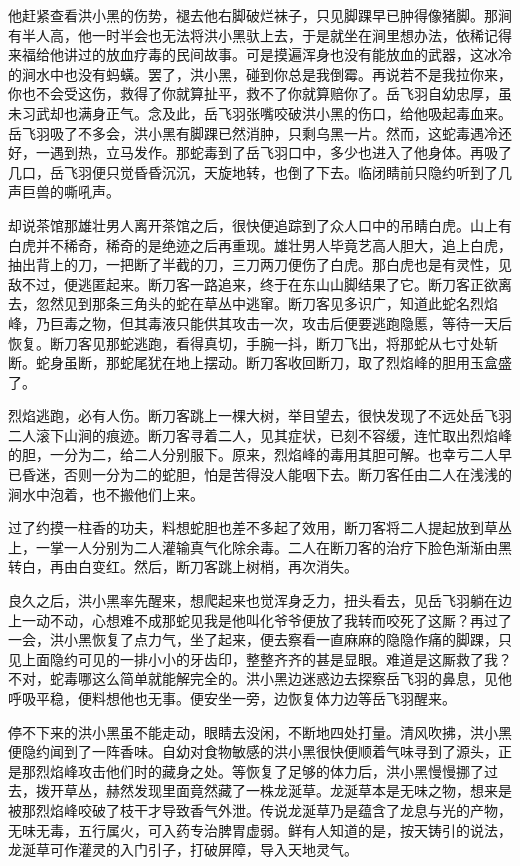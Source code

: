 他赶紧查看洪小黑的伤势，褪去他右脚破烂袜子，只见脚踝早已肿得像猪脚。那涧有半人高，他一时半会也无法将洪小黑驮上去，于是就坐在涧里想办法，依稀记得来福给他讲过的放血疗毒的民间故事。可是摸遍浑身也没有能放血的武器，这冰冷的涧水中也没有蚂蟥。罢了，洪小黑，碰到你总是我倒霉。再说若不是我拉你来，你也不会受这伤，救得了你就算扯平，救不了你就算赔你了。岳飞羽自幼忠厚，虽未习武却也满身正气。念及此，岳飞羽张嘴咬破洪小黑的伤口，给他吸起毒血来。岳飞羽吸了不多会，洪小黑有脚踝已然消肿，只剩乌黑一片。然而，这蛇毒遇冷还好，一遇到热，立马发作。那蛇毒到了岳飞羽口中，多少也进入了他身体。再吸了几口，岳飞羽便只觉昏昏沉沉，天旋地转，也倒了下去。临闭睛前只隐约听到了几声巨兽的嘶吼声。

却说茶馆那雄壮男人离开茶馆之后，很快便追踪到了众人口中的吊睛白虎。山上有白虎并不稀奇，稀奇的是绝迹之后再重现。雄壮男人毕竟艺高人胆大，追上白虎，抽出背上的刀，一把断了半截的刀，三刀两刀便伤了白虎。那白虎也是有灵性，见敌不过，便逃匿起来。断刀客一路追来，终于在东山山脚结果了它。断刀客正欲离去，忽然见到那条三角头的蛇在草丛中逃窜。断刀客见多识广，知道此蛇名烈焰峰，乃巨毒之物，但其毒液只能供其攻击一次，攻击后便要逃跑隐慝，等待一天后恢复。断刀客见那蛇逃跑，看得真切，手腕一抖，断刀飞出，将那蛇从七寸处斩断。蛇身虽断，那蛇尾犹在地上摆动。断刀客收回断刀，取了烈焰峰的胆用玉盒盛了。

烈焰逃跑，必有人伤。断刀客跳上一棵大树，举目望去，很快发现了不远处岳飞羽二人滚下山涧的痕迹。断刀客寻着二人，见其症状，已刻不容缓，连忙取出烈焰峰的胆，一分为二，给二人分别服下。原来，烈焰峰的毒用其胆可解。也幸亏二人早已昏迷，否则一分为二的蛇胆，怕是苦得没人能咽下去。断刀客任由二人在浅浅的涧水中泡着，也不搬他们上来。

过了约摸一柱香的功夫，料想蛇胆也差不多起了效用，断刀客将二人提起放到草丛上，一掌一人分别为二人灌输真气化除余毒。二人在断刀客的治疗下脸色渐渐由黑转白，再由白变红。然后，断刀客跳上树梢，再次消失。

良久之后，洪小黑率先醒来，想爬起来也觉浑身乏力，扭头看去，见岳飞羽躺在边上一动不动，心想难不成那蛇见我是他叫化爷爷便放了我转而咬死了这厮？再过了一会，洪小黑恢复了点力气，坐了起来，便去察看一直麻麻的隐隐作痛的脚踝，只见上面隐约可见的一排小小的牙齿印，整整齐齐的甚是显眼。难道是这厮救了我？不对，蛇毒哪这么简单就能解完全的。洪小黑边迷惑边去探察岳飞羽的鼻息，见他呼吸平稳，便料想他也无事。便安坐一旁，边恢复体力边等岳飞羽醒来。

停不下来的洪小黑虽不能走动，眼睛去没闲，不断地四处打量。清风吹拂，洪小黑便隐约闻到了一阵香味。自幼对食物敏感的洪小黑很快便顺着气味寻到了源头，正是那烈焰峰攻击他们时的藏身之处。等恢复了足够的体力后，洪小黑慢慢挪了过去，拨开草丛，赫然发现里面竟然藏了一株龙涎草。龙涎草本是无味之物，想来是被那烈焰峰咬破了枝干才导致香气外泄。传说龙涎草乃是蕴含了龙息与光的产物，无味无毒，五行属火，可入药专治脾胃虚弱。鲜有人知道的是，按天铸引的说法，龙涎草可作灌灵的入门引子，打破屏障，导入天地灵气。

